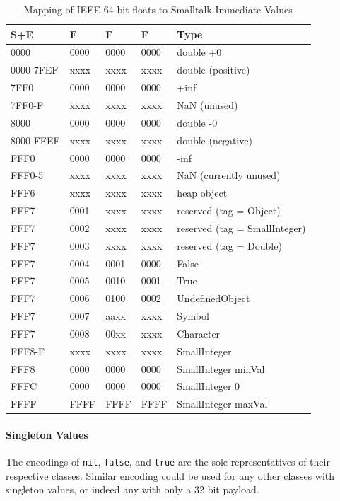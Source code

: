 \documentclass[
]{ceurart}
\begin{document}
\begin{table}[htbp]\label{immediates}
  \caption{Mapping of IEEE 64-bit floats to Smalltalk Immediate Values}
  \begin{tabular}{l|l|l|l|l}
 S+E       & F    & F    & F    & Type            \\
\hline
 0000      & 0000 & 0000 & 0000 & double  +0      \\
 0000-7FEF & xxxx & xxxx & xxxx & double (positive)         \\
 7FF0      & 0000 & 0000 & 0000 & +inf            \\
 7FF0-F    & xxxx & xxxx & xxxx & NaN (unused)    \\
 8000      & 0000 & 0000 & 0000 & double     -0   \\
 8000-FFEF & xxxx & xxxx & xxxx & double (negative)         \\
 FFF0      & 0000 & 0000 & 0000 & -inf            \\
 FFF0-5      & xxxx & xxxx & xxxx & NaN (currently unused)\\
 FFF6      & xxxx & xxxx & xxxx & heap object \\
 FFF7      & 0001 & xxxx & xxxx & reserved (tag = Object) \\
 FFF7      & 0002 & xxxx & xxxx & reserved (tag = SmallInteger) \\
 FFF7      & 0003 & xxxx & xxxx & reserved (tag = Double) \\
 FFF7      & 0004 & 0001 & 0000 & False \\
 FFF7      & 0005 & 0010 & 0001 & True \\
 FFF7      & 0006 & 0100 & 0002 & UndefinedObject \\
 FFF7      & 0007 & aaxx & xxxx & Symbol \\
 FFF7      & 0008 & 00xx & xxxx & Character \\
 FFF8-F      & xxxx & xxxx & xxxx & SmallInteger \\
 FFF8      & 0000 & 0000 & 0000 & SmallInteger minVal\\
 FFFC      & 0000 & 0000 & 0000 & SmallInteger  0\\
 FFFF      & FFFF & FFFF & FFFF & SmallInteger maxVal\\

  \end{tabular}
\end{table}

\paragraph{Singleton Values}
The encodings of \verb|nil|, \verb|false|, and \verb|true| are the sole representatives of their respective classes.
Similar encoding could be used for any other classes with singleton values, or indeed any with only a 32 bit payload.
\end{document}
